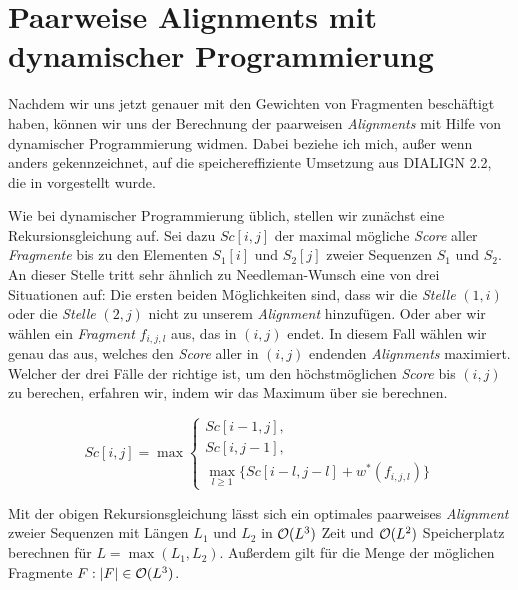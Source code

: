 \section{Paarweise Alignments mit dynamischer Programmierung}

Nachdem wir uns jetzt genauer mit den Gewichten von Fragmenten beschäftigt haben, können wir uns der Berechnung der paarweisen \emph{Alignments} mit Hilfe von dynamischer Programmierung widmen. Dabei beziehe ich mich, außer wenn anders gekennzeichnet, auf die speichereffiziente Umsetzung aus DIALIGN 2.2, die in \cite{m02} vorgestellt wurde. 

Wie bei dynamischer Programmierung üblich, stellen wir zunächst eine Rekursionsgleichung auf. Sei dazu $Sc[i,j]$ der maximal mögliche \emph{Score} aller \emph{Fragmente} bis zu den Elementen $S_1[i]$ und $S_2[j]$ zweier Sequenzen $S_1$ und $S_2$. An dieser Stelle tritt sehr ähnlich zu Needleman-Wunsch eine von drei Situationen auf: Die ersten beiden Möglichkeiten sind, dass wir die \emph{Stelle} $(1,i)$ oder die \emph{Stelle} $(2,j)$ nicht zu unserem \emph{Alignment} hinzufügen. Oder aber wir wählen ein \emph{Fragment} $f_{i,j,l}$ aus, das in $(i,j)$ endet. In diesem Fall wählen wir genau das aus, welches den \emph{Score} aller in $(i,j)$ endenden \emph{Alignments} maximiert. Welcher der drei Fälle der richtige ist, um den höchstmöglichen \emph{Score} bis $(i,j)$ zu berechen, erfahren wir, indem wir das Maximum über sie berechnen.

\begin{equation}\label{eq:dp_score2}
	Sc[i,j] = \max
	\begin{cases}
		Sc[i-1,j], \\
		Sc[i,j-1], \\
		\max_{l\geq 1}\{Sc[i\!-\!l,j\!-\!l] + w^*(f_{i,j,l})\}
	\end{cases}
\end{equation}

\begin{satz}
	Mit der obigen Rekursionsgleichung lässt sich ein optimales paarweises \emph{Alignment} zweier Sequenzen mit Längen $L_1$ und $L_2$ in $\mathcal{O}(L^3)$ Zeit und $\mathcal{O}(L^2)$ Speicherplatz berechnen für $L = \max(L_1, L_2)$. Außerdem gilt für die Menge der möglichen Fragmente $F: |F| \in \mathcal{O}(L^3)$.
\end{satz}
	
